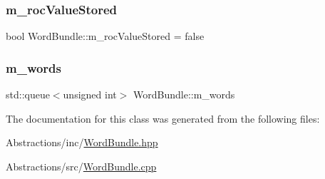\mbox{\label{class_word_bundle_a7605157c872054d7ab42b590fac97ca7}} 
\subsubsection{\texorpdfstring{m\+\_\+roc\+Value\+Stored}{m\_rocValueStored}}
{\footnotesize\ttfamily bool Word\+Bundle\+::m\+\_\+roc\+Value\+Stored = false\hspace{0.3cm}{\ttfamily [private]}}

\mbox{\label{class_word_bundle_a58233a5455b9a594e3441dd79e3d6a3b}} 
\subsubsection{\texorpdfstring{m\+\_\+words}{m\_words}}
{\footnotesize\ttfamily std\+::queue$<$unsigned int$>$ Word\+Bundle\+::m\+\_\+words\hspace{0.3cm}{\ttfamily [private]}}



The documentation for this class was generated from the following files\+:\begin{DoxyCompactItemize}
\item 
Abstractions/inc/\hyperlink{_word_bundle_8hpp}{Word\+Bundle.\+hpp}\item 
Abstractions/src/\hyperlink{_word_bundle_8cpp}{Word\+Bundle.\+cpp}\end{DoxyCompactItemize}
